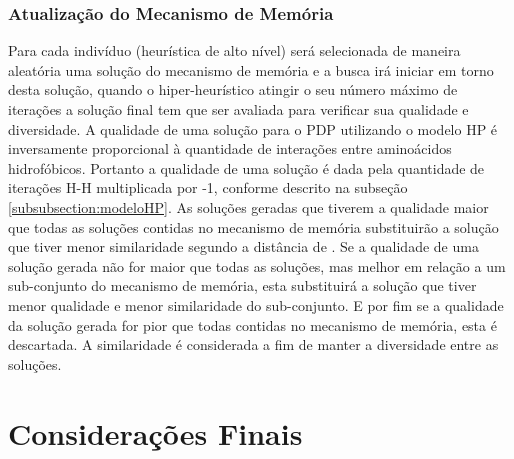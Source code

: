 \subsubsection{Atualização do Mecanismo de Memória}
Para cada indivíduo (heurística de alto nível) será selecionada de maneira aleatória uma solução do mecanismo de memória e a busca irá iniciar em torno desta solução, quando o  hiper-heurístico atingir o seu número máximo de iterações a solução final tem que ser avaliada para verificar sua qualidade e diversidade. A qualidade de uma solução para o PDP utilizando o modelo HP é inversamente proporcional à quantidade de interações entre aminoácidos hidrofóbicos. Portanto a qualidade de uma solução é dada pela quantidade de iterações H-H multiplicada por -1, conforme descrito na subseção \ref{subsubsection:modeloHP}.  As soluções geradas que tiverem a qualidade maior que todas as soluções contidas no mecanismo de memória substituirão a solução que tiver menor similaridade segundo a distância de  \cite{hamming1950error}. Se a qualidade de uma solução gerada não for maior que todas as soluções, mas melhor em relação a um sub-conjunto do mecanismo de memória, esta substituirá a solução que tiver menor qualidade e menor similaridade do sub-conjunto. E por fim se a qualidade da solução gerada for pior que todas contidas no mecanismo de memória, esta é descartada. A similaridade é considerada a fim de manter a diversidade entre as soluções.  



\section{Considerações Finais}
\label{Metodologia:ConsideracoesFinais}

